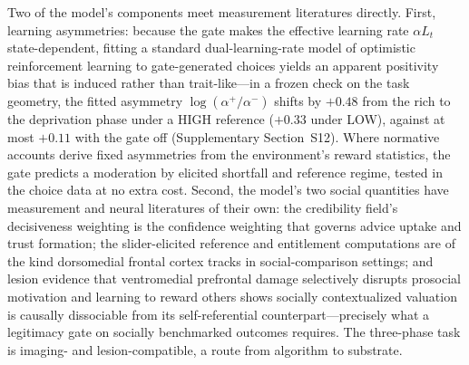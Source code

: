 \documentclass[11pt]{article}
\newcommand{\1}{\mathbf{1}}
\begin{document}
Two of the model's components meet measurement literatures directly. First, learning asymmetries: because the gate makes the effective learning rate $\alpha L_t$ state-dependent, fitting a standard dual-learning-rate model of optimistic reinforcement learning\cite{Lefebvre2017} to gate-generated choices yields an apparent positivity bias that is induced rather than trait-like---in a frozen check on the task geometry, the fitted asymmetry $\log(\alpha^+/\alpha^-)$ shifts by $+0.48$ from the rich to the deprivation phase under a HIGH reference ($+0.33$ under LOW), against at most $+0.11$ with the gate off (Supplementary Section~S12). Where normative accounts derive fixed asymmetries from the environment's reward statistics\cite{CazeVanDerMeer2013}, the gate predicts a moderation by elicited shortfall and reference regime, tested in the choice data at no extra cost. Second, the model's two social quantities have measurement and neural literatures of their own: the credibility field's decisiveness weighting is the confidence weighting that governs advice uptake and trust formation\cite{PescetelliYeung2021,PescetelliHauperichYeung2021}; the slider-elicited reference and entitlement computations are of the kind dorsomedial frontal cortex tracks in social-comparison settings\cite{Wittmann2016,Wittmann2025}; and lesion evidence that ventromedial prefrontal damage selectively disrupts prosocial motivation and learning to reward others\cite{Lockwood2024,Gueguen2025} shows socially contextualized valuation is causally dissociable from its self-referential counterpart---precisely what a legitimacy gate on socially benchmarked outcomes requires. The three-phase task is imaging- and lesion-compatible, a route from algorithm to substrate.
\end{document}
